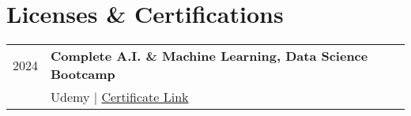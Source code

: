 \documentclass[]{deedy-resume-openfont}
\begin{document}
\begin{minipage}[t]{0.66\textwidth}

    \section{Licenses \& Certifications} 
    \begin{tabular}{rp{8cm}}
        2024 & \textbf{Complete A.I. \& Machine Learning, Data Science Bootcamp} \\
            & Udemy | \href{https://www.udemy.com/certificate/UC-3cbee6e1-4004-4ce4-8835-d999077730fc/}{Certificate Link} \\
        \end{tabular}
    \sectionsep


    \end{minipage} 
    
\end{document}
